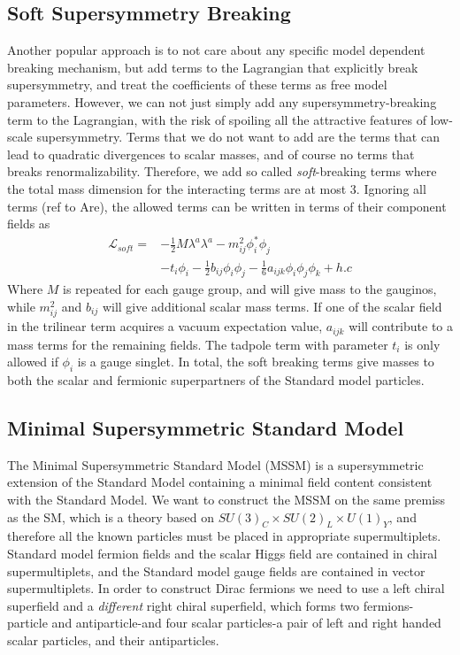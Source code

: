 \subsection{Soft Supersymmetry Breaking}
Another popular approach is to not care about any specific model dependent breaking mechanism, but add terms to the Lagrangian that explicitly break supersymmetry, and treat the coefficients of these terms as free model parameters. However, we can not just simply add any supersymmetry-breaking term to the Lagrangian, with the risk of spoiling all the attractive features of low-scale supersymmetry. Terms that we do not want to add are the terms that can lead to quadratic divergences to scalar masses, and of course no terms that breaks renormalizability. Therefore, we add so called \emph{soft}-breaking terms where the total mass dimension for the interacting terms are at most 3. Ignoring all  terms (ref to Are), the allowed terms can be written in terms of their component fields as
\begin{align}
    \mathcal{L}_{soft}=&-\frac{1}{2}M\lambda^{a}\lambda^{a}-m_{ij}^{2}\phi_{i}^{*}\phi_{j}
    \\
    &-t_{i}\phi_{i}-\frac{1}{2}b_{ij}\phi_{i}\phi_{j}-\frac{1}{6}a_{ijk}\phi_{i}\phi_{j}\phi_{k}+h.c
\end{align}
Where $M$ is repeated for each gauge group, and will give mass to the gauginos, while $m_{ij}^{2}$ and $b_{ij}$ will give additional scalar mass terms. If one of the scalar field in the trilinear term acquires a vacuum expectation value, $a_{ijk}$ will contribute to a mass terms for the remaining fields. The tadpole term with parameter $t_{i}$ is only allowed if $\phi_{i}$ is a gauge singlet. In total, the soft breaking terms give masses to both the scalar and fermionic superpartners of the Standard model particles.

\subsection{Minimal Supersymmetric Standard Model}
The Minimal Supersymmetric Standard Model (MSSM) is a supersymmetric extension of the Standard Model containing a minimal field content consistent with the Standard Model. We want to construct the MSSM on the same premiss as the SM, which is a theory based on $SU(3)_{C}\times SU(2)_{L}\times U(1)_{Y}$, and therefore all the known particles must be placed in appropriate supermultiplets. Standard model fermion fields and the scalar Higgs field are contained in chiral supermultiplets, and the Standard model gauge fields are contained in vector supermultiplets. In order to construct Dirac fermions we need to use a left chiral superfield and a \emph{different} right chiral superfield, which forms two fermions-particle and antiparticle-and four scalar particles-a pair of left and right handed scalar particles, and their antiparticles.

